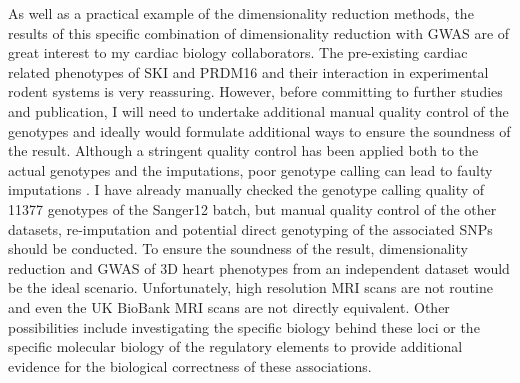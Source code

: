 As well as a practical example of the dimensionality reduction methods, the results of this specific combination of dimensionality reduction with GWAS are of great interest to my cardiac biology collaborators. The pre-existing cardiac related phenotypes of SKI and PRDM16 and their interaction in experimental rodent systems is very reassuring. However, before committing to further studies and publication, I will need to undertake additional manual quality control of the genotypes and ideally  would formulate additional ways to ensure the soundness of the result. Although a stringent quality control has been applied both to the actual genotypes and the imputations, poor genotype calling can lead to faulty imputations \citep{Morris2010}. I have already manually checked the genotype calling quality of \num{11377} genotypes of the Sanger12 batch, but manual quality control of the other datasets, re-imputation and potential direct genotyping of the associated SNPs should be conducted. To ensure the soundness of the result, dimensionality reduction and GWAS of 3D heart phenotypes from an independent dataset would be the ideal scenario. Unfortunately, high resolution MRI scans are not routine and even the UK BioBank MRI scans are not directly equivalent. Other possibilities include investigating the specific biology behind these loci or the specific molecular biology of the regulatory elements to provide additional evidence for the biological correctness of these associations.

